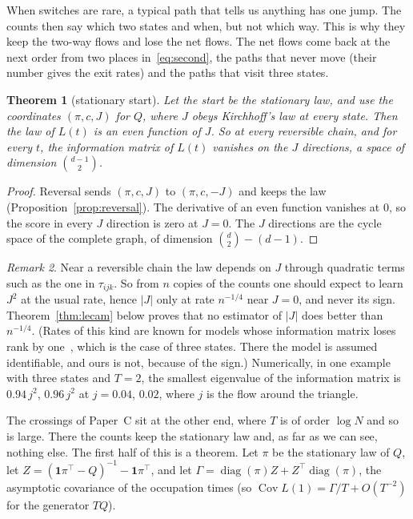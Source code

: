 \documentclass[11pt]{article}
\newtheorem{theorem}{Theorem}[section]
\theoremstyle{definition}
\theoremstyle{remark}
\newtheorem{remark}[theorem]{Remark}
\newcommand{\one}{\mathbf 1}
\begin{document}
When switches are rare, a typical path that tells us anything has one jump. The
counts then say which two states and when, but not which way. This is why they
keep the two-way flows and lose the net flows. The net flows come back at the
next order from two places in~\eqref{eq:second}, the paths that never move (their
number gives the exit rates) and the paths that visit three states.

\begin{theorem}[stationary start]\label{thm:singular}
Let the start be the stationary law, and use the coordinates $(\pi,c,J)$ for
$Q$, where $J$ obeys Kirchhoff's law at every state. Then the law of $L(t)$ is
an even function of $J$. So at every reversible chain, and for every $t$, the
information matrix of $L(t)$ vanishes on the $J$ directions, a space of dimension
$\binom{d-1}2$.
\end{theorem}
\begin{proof}
Reversal sends $(\pi,c,J)$ to $(\pi,c,-J)$ and keeps the law
(Proposition~\ref{prop:reversal}). The derivative of an even function vanishes
at $0$, so the score in every $J$ direction is zero at $J=0$. The $J$ directions
are the cycle space of the complete graph, of dimension
$\binom d2-(d-1)$.
\end{proof}

\begin{remark}
Near a reversible chain the law depends on $J$ through quadratic terms such as
the one in $\tau_{ijk}$. So from $n$ copies of the counts one should expect to
learn $J^2$ at the usual rate, hence $|J|$ only at rate $n^{-1/4}$ near $J=0$,
and never its sign. Theorem~\ref{thm:lecam} below proves that no estimator of
$|J|$ does better than $n^{-1/4}$. (Rates of this kind are known for
models whose information matrix loses rank by one~\cite{rcbr2000}, which is
the case of three states. There the model is assumed identifiable, and ours is
not, because of the sign.) Numerically, in one example with three states and $T=2$, the smallest
eigenvalue of the information matrix is $0.94\,j^2$, $0.96\,j^2$ at $j=0.04$,
$0.02$, where $j$ is the flow around the triangle.
\end{remark}

The crossings of Paper~C sit at the other end, where $T$ is of order $\log N$
and so is large. There the counts keep the stationary law and, as far as we can
see, nothing else. The first half of this is a theorem. Let $\pi$ be the
stationary law of $Q$, let $Z=(\one\pi^{\top}-Q)^{-1}-\one\pi^{\top}$, and let
$\Gamma=\operatorname{diag}(\pi)Z+Z^{\top}\operatorname{diag}(\pi)$, the
asymptotic covariance of the occupation times (so $\operatorname{Cov}L(1)
=\Gamma/T+O(T^{-2})$ for the generator $TQ$).
\end{document}

